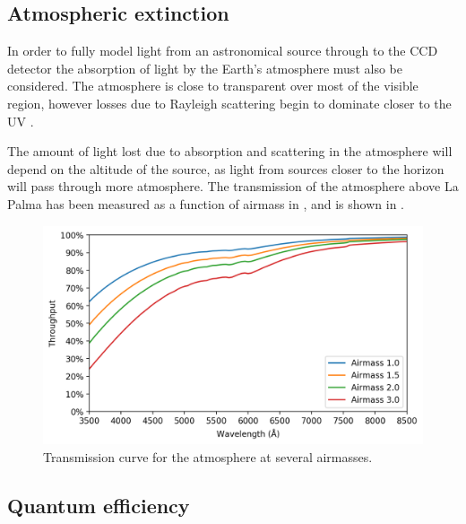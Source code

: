 \begin{colsection}
\begin{colsection}
\end{colsection}

\newpage
\subsection{Atmospheric extinction}
\label{sec:atmosphere}
\begin{colsection}

In order to fully model light from an astronomical source through to the CCD detector the absorption of light by the Earth's atmosphere must also be considered. The atmosphere is close to transparent over most of the visible region, however losses due to Rayleigh scattering begin to dominate closer to the UV \citep{atmosphere}.

The amount of light lost due to absorption and scattering in the atmosphere will depend on the altitude of the source, as light from sources closer to the horizon will pass through more atmosphere. The transmission of the atmosphere above La Palma has been measured as a function of airmass in \citet{tn31}, and is shown in .

\begin{figure}[t]
    \begin{center}
        \includegraphics[width=\textwidth]{images/throughput/trans_atm.png}
    \end{center}
    \caption[Atmospheric transmission curve]{
        Transmission curve for the atmosphere at several airmasses.
    }\label{fig:trans_atm}
\end{figure}

\end{colsection}

\newpage
\subsection{Quantum efficiency}
\label{sec:qe}
\begin{colsection}


\end{colsection}
\end{colsection}
